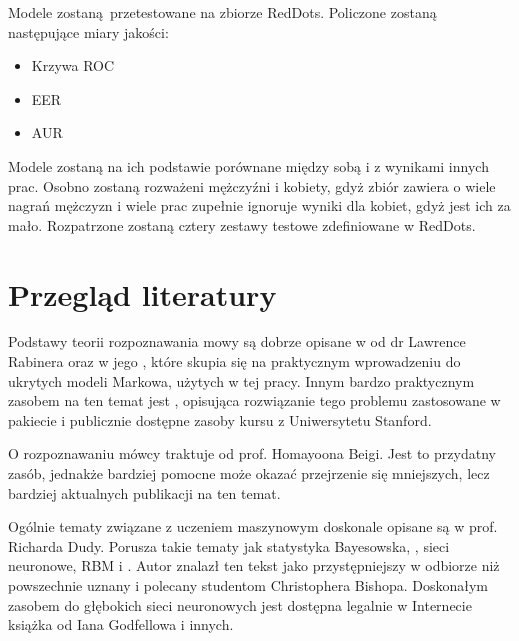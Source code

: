 Modele zostaną przetestowane na zbiorze RedDots. Policzone zostaną następujące miary jakości:

\begin{itemize}
  \item Krzywa ROC
  \item EER
  \item AUR
\end{itemize}

Modele zostaną na ich podstawie porównane między sobą i z wynikami innych prac. Osobno zostaną rozważeni mężczyźni 
i kobiety, gdyż zbiór zawiera o wiele nagrań mężczyzn i wiele prac zupełnie ignoruje wyniki dla kobiet, 
gdyż jest ich za mało. Rozpatrzone zostaną cztery zestawy testowe zdefiniowane w RedDots.

\section{Przegląd literatury}\label{sec:przeglad_literatury}

Podstawy teorii rozpoznawania mowy są dobrze opisane w  
od dr Lawrence Rabinera oraz w jego 
, które
skupia się na praktycznym wprowadzeniu do ukrytych modeli Markowa, użytych w tej pracy.
Innym bardzo praktycznym zasobem na ten temat jest , opisująca rozwiązanie
tego problemu zastosowane w pakiecie  i publicznie dostępne zasoby
kursu  z Uniwersytetu Stanford.

O rozpoznawaniu mówcy traktuje  od prof. Homayoona Beigi.
Jest to przydatny zasób, jednakże bardziej pomocne może okazać przejrzenie się mniejszych, lecz
bardziej aktualnych publikacji na ten temat.

Ogólnie tematy związane z uczeniem maszynowym doskonale opisane są w  prof. Richarda Dudy.
Porusza takie tematy jak statystyka Bayesowska, , sieci neuronowe, RBM 
i . Autor znalazł ten tekst jako przystępniejszy w odbiorze niż powszechnie 
uznany i polecany studentom  Christophera Bishopa. 
Doskonałym zasobem do głębokich sieci neuronowych jest dostępna legalnie w Internecie książka 
\cite{deeplearningbook} od Iana Godfellowa i innych.

